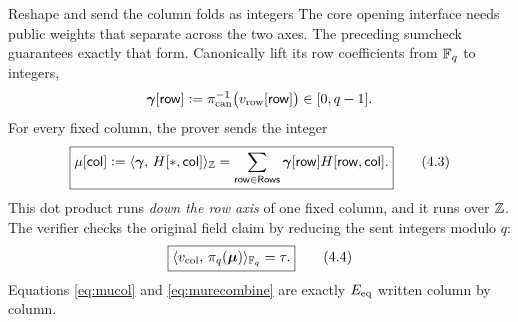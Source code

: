 \begin{step}{Reshape and send the column folds as integers}{%
}\label{step:tensor}
The core opening interface needs public weights that separate across the two
axes.  The preceding sumcheck guarantees exactly that form.  Canonically lift
its row coefficients from $\mathbb{F}_q$ to integers,
\[
  \bm{\gamma}[\mathsf{row}]
  \vcentcolon=\pi_{\mathrm{can}}^{-1}
     \bigl(v_{\mathrm{row}}[\mathsf{row}]\bigr)\in[0,q-1].
\]
For every fixed column, the prover sends the integer
\[
  \boxed{
  \mu[\mathsf{col}]
  \vcentcolon=
  \langle \bm{\gamma},\, H[*,\mathsf{col}]\rangle_{\mathbb{Z}}
  =\sum_{\mathsf{row}\in\mathsf{Rows}}
       \bm{\gamma}[\mathsf{row}]H[\mathsf{row},\mathsf{col}] .}       \tag{4.3}\label{eq:mucol}
\]
This dot product runs \emph{down the row axis} of one fixed column, and it runs
over $\mathbb{Z}$.  The verifier checks the original field claim by reducing the sent
integers modulo $q$:
\[
  \boxed{\langle v_{\mathrm{col}},\, \pi_q(\bm\mu)\rangle_{\mathbb{F}_q}=\tau.}  \tag{4.4}\label{eq:murecombine}
\]
Equations \eqref{eq:mucol} and \eqref{eq:murecombine} are exactly
$E_{\rm eq}$ written column by column.

\begin{center}
\end{center}
\end{step}
